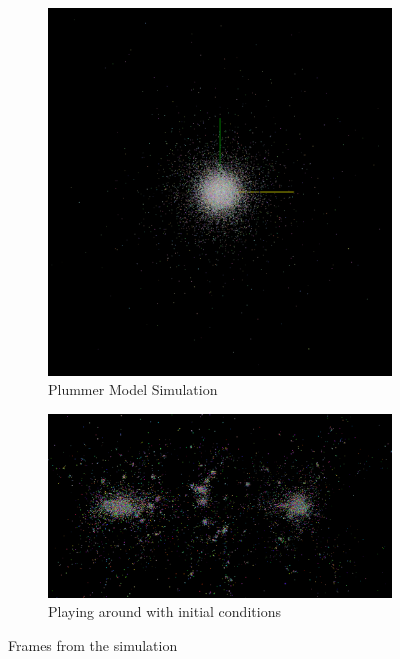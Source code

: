 \documentclass[a4paper, 11pt]{article}         %
\begin{document}
\begin{figure}
\centering
\begin{subfigure}{.5\textwidth}
  \centering
  \includegraphics[clip, trim=6cm 6cm 6cm 6cm,width=\linewidth]{images/simulation}
  \caption{Plummer Model Simulation}
  \label{fig:plummer}
\end{subfigure}%
\begin{subfigure}{.5\textwidth}
  \centering
  \includegraphics[clip, trim=6cm 0cm 6cm 0cm, width=\linewidth]{images/simulation2}
  \caption{Playing around with initial conditions}
  \label{fig:multiple}
\end{subfigure}
\caption{Frames from the simulation}
\label{fig:test}
\end{figure}
\end{document}
